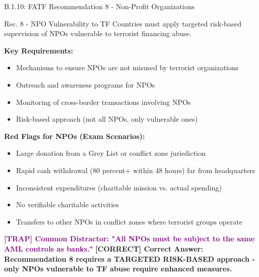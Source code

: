 \documentclass[11pt,a4paper]{beamer}
\newcommand{\trap}[1]{\textcolor{purple}{\textbf{[TRAP] #1}}}
\newcommand{\correct}[1]{\textcolor{green!50!black}{\textbf{[CORRECT] #1}}}
\begin{document}
	\begin{frame}{B.1.10: FATF Recommendation 8 - Non-Profit Organizations}
		\begin{block}{Rec. 8 - NPO Vulnerability to TF}
			Countries must apply targeted risk-based supervision of NPOs vulnerable to terrorist financing abuse.
		\end{block}
		\textbf{Key Requirements:}
		\begin{itemize}
			\item Mechanisms to ensure NPOs are not misused by terrorist organizations
			\item Outreach and awareness programs for NPOs
			\item Monitoring of cross-border transactions involving NPOs
			\item Risk-based approach (not all NPOs, only vulnerable ones)
		\end{itemize}
		\textbf{Red Flags for NPOs (Exam Scenarios):}
		\begin{itemize}
			\item Large donation from a Grey List or conflict zone jurisdiction
			\item Rapid cash withdrawal (80 percent+ within 48 hours) far from headquarters
			\item Inconsistent expenditures (charitable mission vs. actual spending)
			\item No verifiable charitable activities
			\item Transfers to other NPOs in conflict zones where terrorist groups operate
		\end{itemize}
		\trap{Common Distractor: "All NPOs must be subject to the same AML controls as banks."}
		\correct{Correct Answer: Recommendation 8 requires a TARGETED RISK-BASED approach - only NPOs vulnerable to TF abuse require enhanced measures.}
	\end{frame}
	
\end{document}
